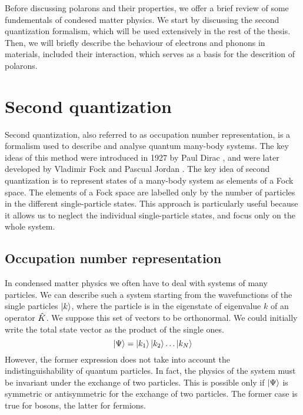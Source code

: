Before discussing polarons and their properties, we offer a brief review of some fundementals of condesed matter physics. We start by discussing the second quantization formalism, which will be used extensively in the rest of the thesis. Then, we will briefly describe the behaviour of electrons and phonons in materials, included their interaction, which serves as a basis for the descrition of polarons.

\section{Second quantization} \label{sec:second_quantization}
Second quantization, also referred to as occupation number representation, is a formalism used to describe and analyse quantum many-body systems. The key ideas of this method were introduced in 1927 by Paul Dirac \cite{dirac1927}, and were later developed by Vladimir Fock and Pascual Jordan \cite{fock1932}. The key idea of second quantization is to represent states of a many-body system as elements of a Fock space. The elements of a Fock space are labelled only by the number of particles in the different single-particle states. This approach is particularly useful because it allows us to neglect the individual single-particle states, and focus only on the whole system.

\subsection{Occupation number representation}
In condensed matter physics we often have to deal with systems of many particles. We can describe such a system starting from the wavefunctions of the single particles $\ket{k}$, where the particle is in the eigenstate of eigenvalue $k$ of an operator $\hat{K}$. We suppose this set of vectors to be orthonormal. We could initially write the total state vector as the product of the single ones.
\begin{equation} \label{eq:simple_base}
    \ket{\Psi} = \ket{k_1}\ket{k_2}\dots\ket{k_N}
\end{equation}
However, the former expression does not take into account the indistinguishability of quantum particles. In fact, the physics of the system must be invariant under the exchange of two particles. This is possible only if $\ket{\Psi}$ is symmetric or antisymmetric for the exchange of two particles. The former case is true for bosons, the latter for fermions. %

